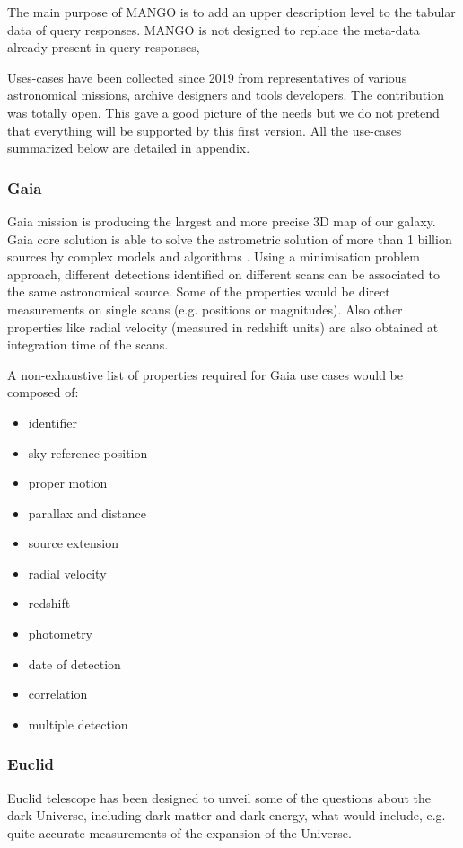 \documentclass[11pt,a4paper]{ivoa}
\begin{document}
The main purpose of MANGO is to add an upper description level to the tabular data of query responses.
MANGO is not designed to replace the meta-data already present in query responses, 

Uses-cases have been collected since 2019 from representatives of various astronomical 
missions, archive designers and tools developers.
The contribution was totally open. This gave a good picture of the needs but we do not pretend 
that everything will be supported by this first version.
All the use-cases summarized below are detailed in appendix.

\subsubsection{Gaia}
Gaia mission is producing the largest and more precise 3D map of our galaxy.
Gaia core solution is able to solve the astrometric solution of more than 1
billion sources by complex models and algorithms \citep{2012A&A...538A..78L}.
Using a minimisation problem approach, different detections identified on
different scans can be associated to the same astronomical source. Some of the
properties would be direct measurements on single scans (e.g. positions or
magnitudes). Also other properties like radial velocity (measured in redshift
units) are also obtained at integration time of the scans.

A non-exhaustive list of properties required for Gaia use cases would be composed
of:

\begin{itemize}[noitemsep,topsep=0pt,parsep=0pt,partopsep=0pt]
    \item identifier
    \item sky reference position
    \item proper motion
    \item parallax and distance

    \item source extension
    \item radial velocity
    \item redshift
    \item photometry
    \item date of detection
    \item correlation
    \item multiple detection
\end{itemize}

\subsubsection{Euclid}
Euclid telescope has been designed to unveil some of the questions about the
dark Universe, including dark matter and dark energy, what would include, e.g.
quite accurate measurements of the expansion of the Universe.
\end{document}
